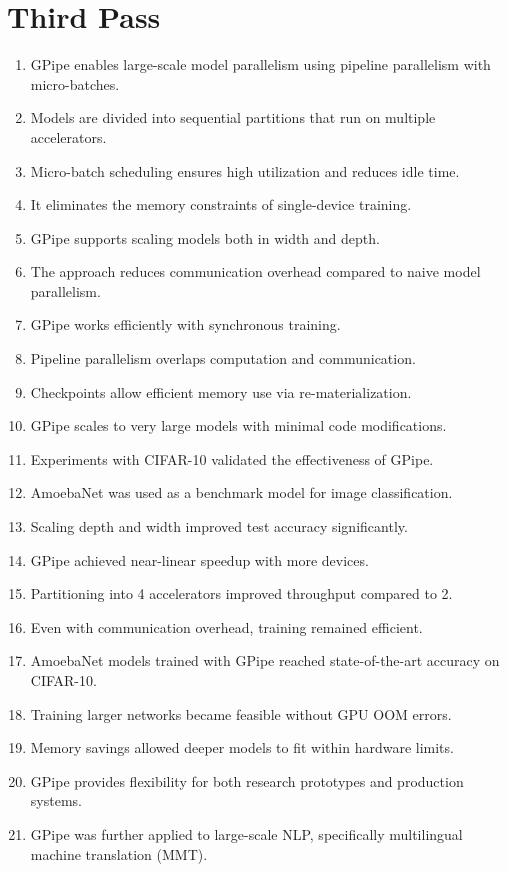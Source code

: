 \documentclass[12pt]{article}
\begin{document}
\section{Third Pass}
\begin{enumerate}
  \item GPipe enables large-scale model parallelism using pipeline parallelism with micro-batches.  
  \item Models are divided into sequential partitions that run on multiple accelerators.  
  \item Micro-batch scheduling ensures high utilization and reduces idle time.  
  \item It eliminates the memory constraints of single-device training.  
  \item GPipe supports scaling models both in width and depth.  
  \item The approach reduces communication overhead compared to naive model parallelism.  
  \item GPipe works efficiently with synchronous training.  
  \item Pipeline parallelism overlaps computation and communication.  
  \item Checkpoints allow efficient memory use via re-materialization.  
  \item GPipe scales to very large models with minimal code modifications.  
  \item Experiments with CIFAR-10 validated the effectiveness of GPipe.  
  \item AmoebaNet was used as a benchmark model for image classification.  
  \item Scaling depth and width improved test accuracy significantly.  
  \item GPipe achieved near-linear speedup with more devices.  
  \item Partitioning into 4 accelerators improved throughput compared to 2.  
  \item Even with communication overhead, training remained efficient.  
  \item AmoebaNet models trained with GPipe reached state-of-the-art accuracy on CIFAR-10.  
  \item Training larger networks became feasible without GPU OOM errors.  
  \item Memory savings allowed deeper models to fit within hardware limits.  
  \item GPipe provides flexibility for both research prototypes and production systems.  
  \item GPipe was further applied to large-scale NLP, specifically multilingual machine translation (MMT).  

\end{enumerate}
\end{document}
